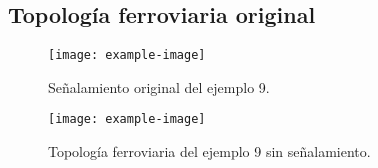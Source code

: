 \subsection{Topología ferroviaria original}

\lipsum[2]


\begin{figure}[H]
	\centering
	\texttt{[image: example-image]}
	\centering\caption{Señalamiento original del ejemplo 9.}
\end{figure}

\lipsum[2]

\begin{figure}[H]
	\centering
	\texttt{[image: example-image]}
	\centering\caption{Topología ferroviaria del ejemplo 9 sin señalamiento.}
\end{figure}

\lipsum[2]
